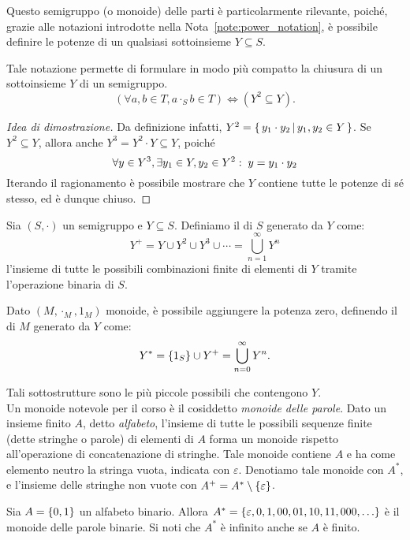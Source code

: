 Questo semigruppo (o monoide) delle parti è particolarmente rilevante, poiché, grazie alle notazioni introdotte nella Nota~\ref{note:power_notation}, è possibile definire le potenze di un qualsiasi sottoinsieme \(Y \subseteq S\).

Tale notazione permette di formulare in modo più compatto la chiusura di un sottoinsieme \(Y\) di un semigruppo.
  \[(\forall a,b \in T, a \cdot_S b \in T)\iff (Y^2 \subseteq Y).\]
\begin{proof}[Idea di dimostrazione]\label{proof:alt_notation_closure}
  Da definizione infatti, \(Y^2 = \set{y_1 \cdot y_2}[y_1,y_2 \in Y]\). Se \(Y^2 \subseteq Y\), allora anche \(Y^3 = Y^2 \cdot Y \subseteq Y\), poiché
  \[\forall y \in Y^3, \exists y_1 \in Y, y_2 \in Y^2:\; y = y_1 \cdot y_2\]
  Iterando il ragionamento è possibile mostrare che \(Y\) contiene tutte le potenze di sé stesso, ed è dunque chiuso.
\end{proof}

\begin{definition}
  Sia \((S,\cdot)\) un semigruppo e \(Y \subseteq S\).
  Definiamo il  di \(S\) generato da \(Y\) come:
  \[Y^+ = Y \cup Y^2 \cup Y^3 \cup \cdots = \bigcup_{n=1}^{\infty} Y^n\]
  l'insieme di tutte le possibili combinazioni finite di elementi di \(Y\) tramite l'operazione binaria di \(S\).

  Dato \((M,\cdot_M,1_M)\) monoide, è possibile aggiungere la potenza zero, definendo il  di \(M\) generato da \(Y\) come:
  \[Y^* = \set{1_S} \cup Y^+ = \bigcup_{n=0}^{\infty} Y^n.\]
\end{definition}

Tali sottostrutture sono le più piccole possibili che contengono \(Y\).\\
Un monoide notevole per il corso è il cosiddetto \emph{monoide delle parole}.
Dato un insieme finito \(A\), detto \emph{alfabeto}, l'insieme di tutte le possibili sequenze finite (dette stringhe o parole) di elementi di \(A\) forma un monoide rispetto all'operazione di concatenazione di stringhe. 
Tale monoide contiene \(A\) e ha come elemento neutro la stringa vuota, indicata con \(\varepsilon\).
Denotiamo tale monoide con \(A^*\), e l'insieme delle stringhe non vuote con \(A^+ = A^* \setminus \set\varepsilon\).

\begin{example}
  Sia \(A = \set{0,1}\) un alfabeto binario.
  Allora \(A^* = \set{\varepsilon, 0, 1, 00, 01, 10, 11, 000, \ldots}\) è il monoide delle parole binarie.
  Si noti che \(A^*\) è infinito anche se \(A\) è finito.
\end{example}

